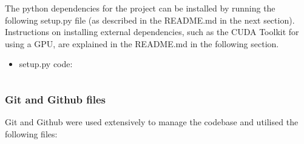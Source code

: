 \documentclass[./project-report/src/latex/project-report.tex]{subfiles}
\begin{document}
The python dependencies for the project can be installed by running the following setup.py file (as described in the README.md in the next section). Instructions on 
installing external dependencies, such as the CUDA Toolkit for using a GPU, are explained in the README.md in the following section.

\begin{itemize}
    \item setup.py code:
        \inputminted{python}{./setup.py}
\end{itemize}

\subsubsection{Git and Github files}

Git and Github were used extensively to manage the codebase and utilised the following files:
\end{document}
